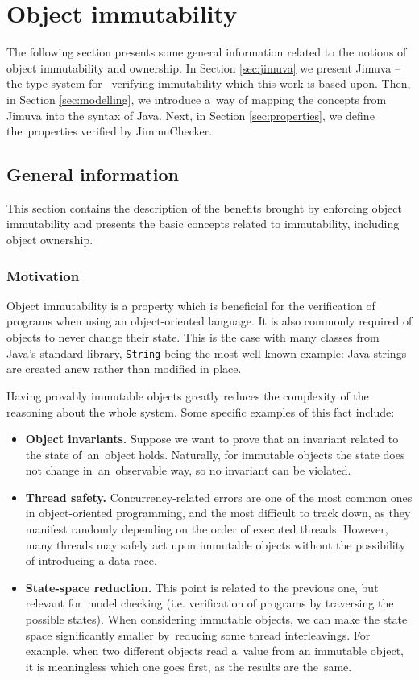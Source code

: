 \documentclass{pracamgr}
\theoremstyle{break}
\theoremstyle{break}
\theoremstyle{break}
\begin{document}
\chapter{Object immutability}
\label{chap:imm}

The following section presents some general information related to the
notions of object immutability and ownership. In Section
\ref{sec:jimuva} we present Jimuva -- the type system for~
ve\-ri\-fy\-ing immutability which this work is based upon. Then, in
Section \ref{sec:modelling}, we introduce a~way of mapping the
concepts from Jimuva into the syntax of Java. Next, in Section
\ref{sec:properties}, we define the~properties verified by
JimmuChecker.

\section{General information}
\label{sec:imm-general}

This section contains the description of the benefits brought by
enforcing object immutability and presents the basic concepts related
to immutability, including object ownership.

\subsection{Motivation}

Object immutability is a property which is beneficial for the
verification of programs when using an object-oriented language. It is
also commonly required of objects to never change their state. This is
the case with many classes from Java's standard library,
\texttt{String} being the most well-known example: Java strings are
created anew rather than modified in place.

Having provably immutable objects greatly reduces the complexity of
the reasoning about the whole system. Some specific examples of this
fact include: 
\begin{itemize}
\item \textbf{Object invariants.} Suppose we want to prove that an
  invariant related to the state of~an~object holds. Naturally, for
  immutable objects the state does not change in~an~observable way,
  so no invariant can be violated.
\item \textbf{Thread safety.} Concurrency-related errors are one of
  the most common ones in object-oriented programming, and the most
  difficult to track down, as they manifest randomly depending on the
  order of executed threads. However, many threads may safely act upon
  immutable objects without the possibility of introducing a data race.
\item \textbf{State-space reduction.} This point is related to the
  previous one, but relevant for~mo\-del checking (i.e. verification
  of programs by traversing the possible states). When considering
  immutable objects, we can make the state space significantly smaller
  by~reducing some thread interleavings. For example, when two
  different objects read a~value from an immutable object, it is
  meaningless which one goes first, as the results are the~same.
\end{itemize}
\end{document}
